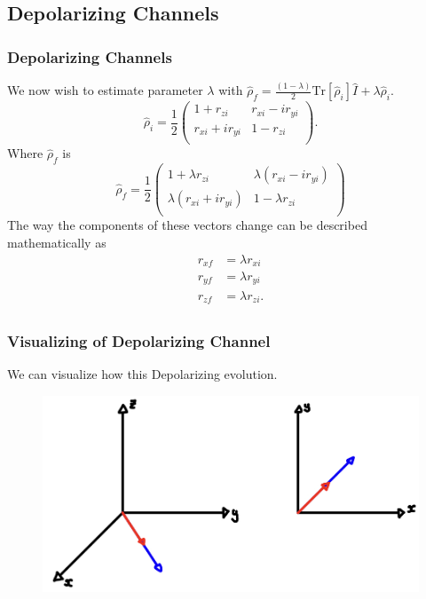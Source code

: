 \documentclass{beamer}
\begin{document}
\subsection{\tiny{Depolarizing Channels}}
\begin{frame}
\frametitle{Depolarizing Channels}
We now wish to estimate parameter $\lambda$ with $\hat{\rho}_f=\frac{(1-\lambda)}{2}\text{Tr}[\hat{\rho}_i]\hat{I}+\lambda\hat{\rho}_i$.
\begin{equation}\label{eq:43}
\hat{\rho}_i=\frac{1}{2}
\begin{pmatrix}
1+r_{zi} & r_{xi}-ir_{yi} \\
r_{xi}+ir_{yi} & 1-r_{zi} \\
\end{pmatrix}.
\end{equation}
Where $\hat{\rho}_f$ is
\begin{equation}\label{eq:44}
\hat{\rho}_f=\frac{1}{2}
\begin{pmatrix}
1+\lambda r_{zi} & \lambda(r_{xi}-ir_{yi}) \\
\lambda(r_{xi}+ir_{yi}) & 1-\lambda r_{zi} \\
\end{pmatrix}
\end{equation}
The way the components of these vectors change can be described mathematically as
\begin{align}\label{eq:45}
r_{xf}&=\lambda r_{xi} \nonumber \\
r_{yf}&=\lambda r_{yi} \nonumber \\
r_{zf}&=\lambda r_{zi}. \nonumber \\
\end{align}
\end{frame}
\begin{frame}
\frametitle{Visualizing of Depolarizing Channel}
We can visualize how this Depolarizing evolution.
\begin{figure}
\begin{center}
\includegraphics[width=0.90\linewidth]{Modeling-Of-Depolarizing-Channel.jpeg}
\end{center}
\end{figure}
\end{frame}
\end{document}
